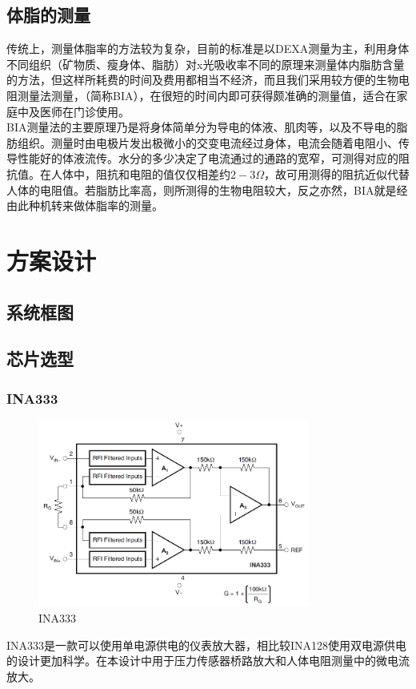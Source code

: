 \documentclass[16pt,a4paper]{article}
\begin{document}
\subsection{体脂的测量}
传统上，测量体脂率的方法较为复杂，目前的标准是以DEXA测量为主，利用身体不同组织（矿物质、瘦身体、脂肪）对x光吸收率不同的原理来测量体内脂肪含量的方法，但这样所耗费的时间及费用都相当不经济，而且我们采用较方便的生物电阻测量法测量，（简称BIA），在很短的时间内即可获得颇准确的测量值，适合在家庭中及医师在门诊使用。 \\
BIA测量法的主要原理乃是将身体简单分为导电的体液、肌肉等，以及不导电的脂肪组织。测量时由电极片发出极微小的交变电流经过身体，电流会随着电阻小、传导性能好的体液流传。水分的多少决定了电流通过的通路的宽窄，可测得对应的阻抗值。在人体中，阻抗和电阻的值仅仅相差约$2-3\Omega$，故可用测得的阻抗近似代替人体的电阻值。若脂肪比率高，则所测得的生物电阻较大，反之亦然，BIA就是经由此种机转来做体脂率的测量。

\section{方案设计}
\subsection{系统框图}

\subsection{芯片选型}
\subsubsection{INA333}
\begin{figure}[H]
\centering
\includegraphics[width=0.8\textwidth]{INA333.png}
\caption{INA333}
\end{figure}
INA333是一款可以使用单电源供电的仪表放大器，相比较INA128使用双电源供电的设计更加科学。在本设计中用于压力传感器桥路放大和人体电阻测量中的微电流放大。
\end{document}
